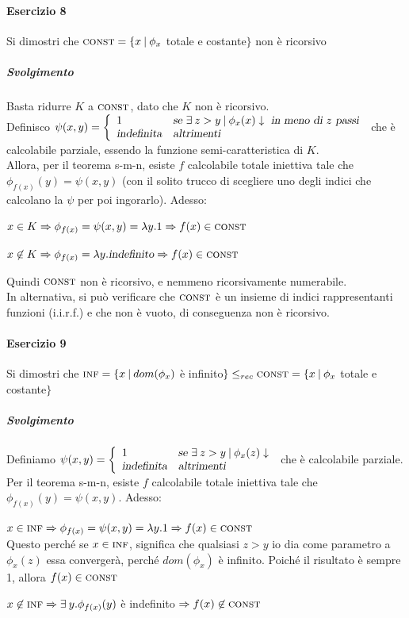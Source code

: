 \documentclass[10pt]{book}
\begin{document}
\paragraph{Esercizio 8} Si dimostri che $\textsc{const} = \{x\:|\:\phi_x$ totale e costante$\}$ non è ricorsivo
\subparagraph{Svolgimento} Basta ridurre $K$ a $\textsc{const}$, dato che $K$ non è ricorsivo.\\
Definisco $\psi(x,y) = \left\{\begin{array}{l l}
1&\textsl{se }\exists\:z > y\:|\:\phi_x(x)\downarrow\textsl{ in meno di }z\textsl{ passi}\\
\textsl{indefinita}&\textsl{altrimenti}
\end{array}\right.$ che è calcolabile parziale, essendo la funzione semi-caratteristica di $K$.\\
Allora, per il teorema s-m-n, esiste $f$ calcolabile totale iniettiva tale che $\phi_{f(x)}(y) = \psi(x,y)$ (con il solito trucco di scegliere uno degli indici che calcolano la $\psi$ per poi ingorarlo). Adesso:
\begin{list}{}{}
	\item $x\in K\Rightarrow\phi_{f(x)} = \psi(x,y) = \lambda y.1 \Rightarrow f(x)\in\textsc{const}$
	\item $x\not\in K\Rightarrow \phi_{f(x)} = \lambda y.\textsl{indefinito}\Rightarrow f(x)\in\textsc{const}$
\end{list}
Quindi $\textsc{const}$ non è ricorsivo, e nemmeno ricorsivamente numerabile.\\
In alternativa, si può verificare che $\textsc{const}$ è un insieme di indici rappresentanti funzioni (i.i.r.f.) e che non è vuoto, di conseguenza non è ricorsivo.
\paragraph{Esercizio 9} Si dimostri che $\textsc{inf} = \{x\:|\:dom(\phi_x)$ è infinito$\}\leq_{rec}\textsc{const} = \{x\:|\:\phi_x$ totale e costante$\}$
\subparagraph{Svolgimento} Definiamo $\psi(x,y) = \left\{ \begin{array}{l l}
1&\textsl{se }\exists\:z > y\:|\:\phi_x(z)\downarrow\\
\textsl{indefinita}&\textsl{altrimenti}
\end{array}\right.$ che è calcolabile parziale. Per il teorema s-m-n, esiste $f$ calcolabile totale iniettiva tale che $\phi_{f(x)}(y) = \psi(x,y)$. Adesso:
\begin{list}{}{}
	\item $x\in\textsc{inf} \Rightarrow \phi_{f(x)} = \psi(x,y) = \lambda y.1 \Rightarrow f(x) \in \textsc{const}$\\
	Questo perché se $x\in \textsc{inf}$, significa che qualsiasi $z > y$ io dia come parametro a $\phi_x(z)$ essa convergerà, perché $dom(\phi_x)$ è infinito. Poiché il risultato è sempre 1, allora $f(x)\in\textsc{const}$
	\item $x\not\in\textsc{inf} \Rightarrow \exists\:y.\phi_{f(x)}(y)$ è indefinito $\Rightarrow f(x) \not\in \textsc{const}$
\end{list}
\end{document}
